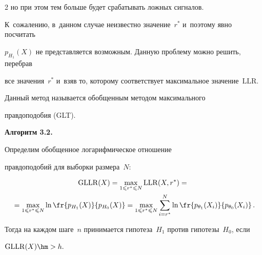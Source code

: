 \begin{multicols}{2}
но при этом тем больше будет срабатывать ложных сигналов.





\smallskip





К~сожалению,  в~данном случае неизвестно значение~$r^*$ и~поэтому явно посчитать 


$p_{H_1}(X)$ не представляется возможным. Данную проблему можно решить, перебрав 


все значения~$r^*$ и~взяв то, которому соответствует максимальное значение~$\mathrm{LLR}$. 


Данный метод называется обобщенным методом максимального 


правдоподобия (GLT).








\smallskip





\noindent


\textbf{Алгоритм 3.2.} %


Определим обобщенное логарифмическое отношение 


правдоподобий для выборки размера~$N$: 


\begin{multline*}


\mathrm{GLLR}(X) =\max\limits_{1   \leqslant r^* \leqslant N } 


\mathrm{LLR}(X, r^*)  ={}\\


{}=\max\limits_{1  \leqslant r^* \leqslant N } 


\ln\fr{p_{H_1}(X)}{p_{H_0}(X)}  =\max\limits_{1  \leqslant r^* \leqslant N } 


\sum\limits_{i = r^*}^N \ln \fr{p_{\theta_1}(X_i)}{p_{\theta_0}(X_i)}\,. 




\end{multline*}


Тогда на каждом шаге~$n$ принимается гипотеза~$H_1$  против гипотезы~$H_0$, если 


$\mathrm{GLLR}(X)\hm>h.$





\smallskip






\end{multicols}
